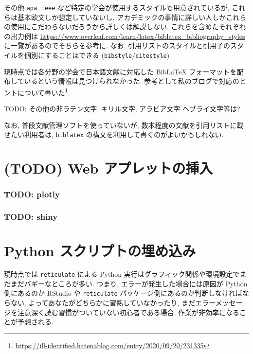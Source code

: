 \documentclass[
]{bxjsbook}
\newenvironment{infobox}[1]{\begin{itemize}\renewcommand{\labelitemi}{\raisebox{-.7\height}[0pt][0pt]{%
  {\setkeys{Gin}{width=3em,keepaspectratio}\texttt{[image: \_latex/\_img/\#1]}}}}
  \setlength{\fboxsep}{1em}
  \begin{greyblock}
  \item
  }{\end{greyblock}\end{itemize}
}
\newenvironment{caution}{\begin{infobox}{caution}}{\end{infobox}}
\theoremstyle{definition}
\theoremstyle{definition}
\theoremstyle{definition}
\theoremstyle{remark}
\begin{document}
その他 \texttt{apa}, \texttt{ieee}
など特定の学会が使用するスタイルも用意されているが,
これらは基本欧文しか想定していないし,
アカデミックの事情に詳しい人しかこれらの使用にこだわらないだろうから詳しくは解説しない.
これらを含めたそれぞれの出力例は
\url{https://www.overleaf.com/learn/latex/biblatex_bibliography_styles}
に一覧があるのでそちらを参考に. なお,
引用リストのスタイルと引用子のスタイルを個別にすることはできる
(\texttt{bibstyle}/\texttt{citestyle})

現時点では各分野の学会で日本語文献に対応した BibLaTeX
フォーマットを配布しているという情報は見つけられなかった.
参考として私のブログで対応のヒントについて書いた\footnote{\url{https://ill-identified.hatenablog.com/entry/2020/09/20/231335}}.

TODO: その他の非ラテン文字, キリル文字, アラビア文字 ヘブライ文字等は?

なお, 普段文献管理ソフトを使っていないが,
数本程度の文献を引用リストに載せたい利用者は, \texttt{biblatex}
の構文を利用して書くのがよいかもしれない.

\hypertarget{webapp}{%
\chapter{(TODO) Web アプレットの挿入}\label{webapp}}

\hypertarget{todo-plotly}{%
\subsection{TODO: plotly}\label{todo-plotly}}

\hypertarget{todo-shiny}{%
\subsection{TODO: shiny}\label{todo-shiny}}

\hypertarget{python}{%
\chapter{Python スクリプトの埋め込み}\label{python}}

\begin{caution}
現時点では \texttt{reticulate} による Python
実行はグラフィック関係や環境設定でまだまだバギーなところが多い. つまり,
エラーが発生した場合には原因が Python 側にあるのか RStudio や
\texttt{reticulate} パッケージ側にあるのか判断しなければならない.
よってあなたがどちらかに習熟していなかったり,
まだエラーメッセージを注意深く読む習慣がついていない初心者である場合,
作業が非効率になることが予想される.
\end{caution}
\end{document}
